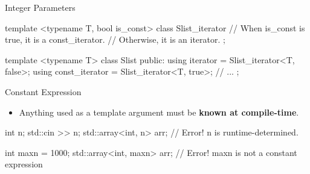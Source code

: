 \begin{frame}[fragile]{Integer Parameters}
    \begin{cpp}
template <typename T, bool is_const>
class Slist_iterator {
  // When is_const is true, it is a const_iterator.
  // Otherwise, it is an iterator.
};

template <typename T>
class Slist {
 public:
  using iterator = Slist_iterator<T, false>;
  using const_iterator = Slist_iterator<T, true>;
  // ...
};
    \end{cpp}
\end{frame}

\begin{frame}[fragile]{Constant Expression}
    \begin{itemize}
        \item Anything used as a template argument must be \textbf{known at compile-time}. 
        \pause
    \end{itemize}
    \begin{cpp}
int n;
std::cin >> n;
std::array<int, n> arr; // Error! n is runtime-determined.
    \end{cpp}
    \pause
    \begin{cpp}
int maxn = 1000;
std::array<int, maxn> arr; // Error! maxn is not a constant expression
    \end{cpp}
\end{frame}